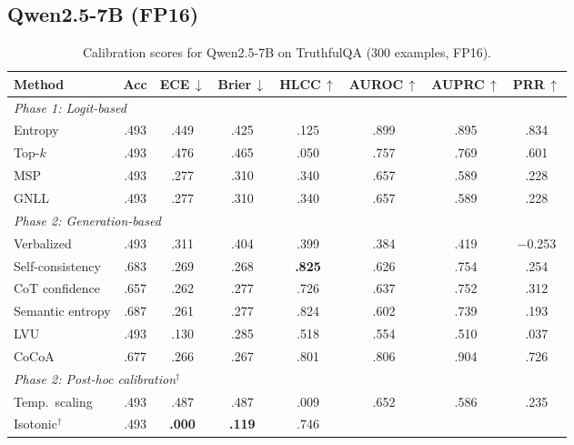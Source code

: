 \documentclass[11pt,a4paper]{article}
\begin{document}
\subsection{Qwen2.5-7B (FP16)}
\label{app:calibration-qwen2.5-7b}

\begin{table}[H]
\centering
\caption{Calibration scores for Qwen2.5-7B on TruthfulQA (300 examples, FP16).}
\label{tab:full-calibration-qwen2.5-7b}
\small
\begin{tabular}{@{}lccccccc@{}}
\toprule
Method & Acc & ECE\,$\downarrow$ & Brier\,$\downarrow$ & HLCC\,$\uparrow$
       & AUROC\,$\uparrow$ & AUPRC\,$\uparrow$ & PRR\,$\uparrow$ \\
\midrule
\multicolumn{8}{l}{\emph{Phase 1: Logit-based}} \\
Entropy                  & .493 & .449 & .425 & .125
                 & .899 & .895 & .834 \\
Top-$k$                  & .493 & .476 & .465 & .050
                 & .757 & .769 & .601 \\
MSP                      & .493 & .277 & .310 & .340
                 & .657 & .589 & .228 \\
GNLL                     & .493 & .277 & .310 & .340
                 & .657 & .589 & .228 \\
\midrule
\multicolumn{8}{l}{\emph{Phase 2: Generation-based}} \\
Verbalized               & .493 & .311 & .404 & .399
                 & .384 & .419 & $-$0.253 \\
Self-consistency         & .683 & .269 & .268 & \textbf{.825}
                 & .626 & .754 & .254 \\
CoT confidence           & .657 & .262 & .277 & .726
                 & .637 & .752 & .312 \\
Semantic entropy         & .687 & .261 & .277 & .824
                 & .602 & .739 & .193 \\
LVU                      & .493 & .130 & .285 & .518
                 & .554 & .510 & .037 \\
CoCoA                    & .677 & .266 & .267 & .801
                 & .806 & .904 & .726 \\
\midrule
\multicolumn{8}{l}{\emph{Phase 2: Post-hoc calibration$^\dagger$}} \\
Temp.\ scaling           & .493 & .487 & .487 & .009
                 & .652 & .586 & .235 \\
Isotonic$^\dagger$       & .493 & \textbf{.000} & \textbf{.119} & .746

\end{tabular}
\end{table}
\end{document}
